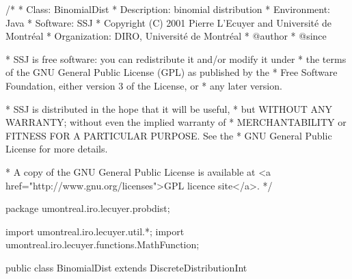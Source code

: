 \begin{code}
\begin{hide}
/*
 * Class:        BinomialDist
 * Description:  binomial distribution
 * Environment:  Java
 * Software:     SSJ 
 * Copyright (C) 2001  Pierre L'Ecuyer and Université de Montréal
 * Organization: DIRO, Université de Montréal
 * @author       
 * @since

 * SSJ is free software: you can redistribute it and/or modify it under
 * the terms of the GNU General Public License (GPL) as published by the
 * Free Software Foundation, either version 3 of the License, or
 * any later version.

 * SSJ is distributed in the hope that it will be useful,
 * but WITHOUT ANY WARRANTY; without even the implied warranty of
 * MERCHANTABILITY or FITNESS FOR A PARTICULAR PURPOSE.  See the
 * GNU General Public License for more details.

 * A copy of the GNU General Public License is available at
   <a href="http://www.gnu.org/licenses">GPL licence site</a>.
 */
\end{hide}
package umontreal.iro.lecuyer.probdist;
\begin{hide}
import umontreal.iro.lecuyer.util.*;
import umontreal.iro.lecuyer.functions.MathFunction;
\end{hide}

public class BinomialDist extends DiscreteDistributionInt\begin{hide} {
   private int n;
   private double p;
   private double q;
   private static final double EPS2 = 100.0*EPSILON;

   private static class Function implements MathFunction {
      protected int m;
      protected int R;
      protected double mean;
      protected int f[];

      public Function (int m, double mean, int R, int f[]) {
         this.m = m;
         this.mean = mean;
         this.R = R;
         this.f = new int[f.length];
         System.arraycopy (f, 0, this.f, 0, f.length);
      }


      public double evaluate (double x) {
         if (x < R)
            return 1e100;

         double sum = 0.0;
         for (int j = 0; j < R; j++)
            sum += f[j] / (x - (double) j);

         return (sum + m * Math.log1p (-mean / x));
      }
   }
\end{hide}
\end{code}
